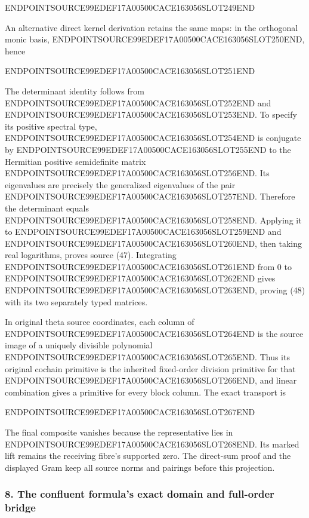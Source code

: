 ENDPOINTSOURCE99EDEF17A00500CACE163056SLOT249END

An alternative direct kernel derivation retains the same maps: in the orthogonal monic basis, ENDPOINTSOURCE99EDEF17A00500CACE163056SLOT250END, hence

ENDPOINTSOURCE99EDEF17A00500CACE163056SLOT251END

The determinant identity follows from ENDPOINTSOURCE99EDEF17A00500CACE163056SLOT252END and ENDPOINTSOURCE99EDEF17A00500CACE163056SLOT253END. To specify its positive spectral type, ENDPOINTSOURCE99EDEF17A00500CACE163056SLOT254END is conjugate by ENDPOINTSOURCE99EDEF17A00500CACE163056SLOT255END to the Hermitian positive semidefinite matrix ENDPOINTSOURCE99EDEF17A00500CACE163056SLOT256END. Its eigenvalues are precisely the generalized eigenvalues of the pair ENDPOINTSOURCE99EDEF17A00500CACE163056SLOT257END. Therefore the determinant equals ENDPOINTSOURCE99EDEF17A00500CACE163056SLOT258END. Applying it to ENDPOINTSOURCE99EDEF17A00500CACE163056SLOT259END and ENDPOINTSOURCE99EDEF17A00500CACE163056SLOT260END, then taking real logarithms, proves source (47). Integrating ENDPOINTSOURCE99EDEF17A00500CACE163056SLOT261END from 0 to ENDPOINTSOURCE99EDEF17A00500CACE163056SLOT262END gives ENDPOINTSOURCE99EDEF17A00500CACE163056SLOT263END, proving (48) with its two separately typed matrices.

In original theta source coordinates, each column of ENDPOINTSOURCE99EDEF17A00500CACE163056SLOT264END is the source image of a uniquely divisible polynomial ENDPOINTSOURCE99EDEF17A00500CACE163056SLOT265END. Thus its original cochain primitive is the inherited fixed-order division primitive for that ENDPOINTSOURCE99EDEF17A00500CACE163056SLOT266END, and linear combination gives a primitive for every block column. The exact transport is

ENDPOINTSOURCE99EDEF17A00500CACE163056SLOT267END

The final composite vanishes because the representative lies in ENDPOINTSOURCE99EDEF17A00500CACE163056SLOT268END. Its marked lift remains the receiving fibre's supported zero. The direct-sum proof and the displayed Gram keep all source norms and pairings before this projection.

\subsubsection{8. The confluent formula's exact domain and full-order bridge}\label{endpoint-arithmetic_intake--the-confluent-formulas-exact-domain-and-full-order-bridge}

